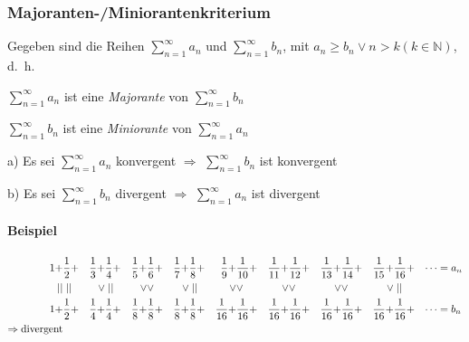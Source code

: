 \subsubsection{Majoranten-/Miniorantenkriterium}

Gegeben sind die Reihen \( \sum\limits^{\infty}_{n=1} a_n \) und  \( \sum\limits^{\infty}_{n=1} b_n \), mit \( a_n \geq b_n \vee n > k (k \in \mathbb{N}) \), d.~h.

\begin{center}

\( \sum\limits^{\infty}_{n=1} a_n \) ist eine \textit{Majorante} von \( \sum\limits^{\infty}_{n=1} b_n \)


\medskip

\( \sum\limits^{\infty}_{n=1} b_n \) ist eine \textit{Miniorante} von \( \sum\limits^{\infty}_{n=1} a_n \)

\bigskip

a) Es sei \( \sum\limits^{\infty}_{n=1} a_n \) konvergent \(\Rightarrow\) \( \sum\limits^{\infty}_{n=1} b_n \) ist konvergent

\medskip

b) Es sei \( \sum\limits^{\infty}_{n=1} b_n \) divergent \(\Rightarrow\) \( \sum\limits^{\infty}_{n=1} a_n \) ist divergent

\end{center}

\paragraph{Beispiel}

\begin{align*}
    1 + & \frac{1}{2} + & \frac{1}{3} + & \frac{1}{4} + & \frac{1}{5} + &\frac{1}{6} + & \frac{1}{7} + & \frac{1}{8} + & \frac{1}{9} + & \frac{1}{10} + & \frac{1}{11} + & \frac{1}{12} + & \frac{1}{13} + & \frac{1}{14} + & \frac{1}{15} + & \frac{1}{16} + & \cdots &= a_n \\
    \mid\mid & \mid\mid & \vee & \mid\mid & \vee & \vee & \vee & \mid\mid & \vee & \vee & \vee & \vee & \vee & \vee & \vee & \mid\mid & & \\ 
    1 + & \frac{1}{2} + & \frac{1}{4} + & \frac{1}{4} + & \frac{1}{8} + &\frac{1}{8} + & \frac{1}{8} + & \frac{1}{8} + & \frac{1}{16} + & \frac{1}{16} + & \frac{1}{16} + & \frac{1}{16} + & \frac{1}{16} + & \frac{1}{16} + & \frac{1}{16} + & \frac{1}{16} + & \cdots &= b_n \\
    \Rightarrow \text{divergent}
\end{align*}
